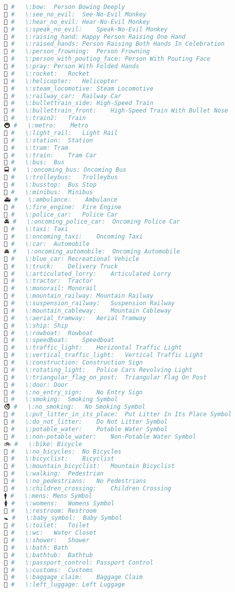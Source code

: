 \begin{lstlisting}[language=Julia, style=julia]
🙇 #   \:bow:  Person Bowing Deeply
🙈 #   \:see_no_evil:  See-No-Evil Monkey
🙉 #   \:hear_no_evil: Hear-No-Evil Monkey
🙊 #   \:speak_no_evil:    Speak-No-Evil Monkey
🙋 #   \:raising_hand: Happy Person Raising One Hand
🙌 #   \:raised_hands: Person Raising Both Hands In Celebration
🙍 #   \:person_frowning:  Person Frowning
🙎 #   \:person_with_pouting_face: Person With Pouting Face
🙏 #   \:pray: Person With Folded Hands
🚀 #   \:rocket:   Rocket
🚁 #   \:helicopter:   Helicopter
🚂 #   \:steam_locomotive: Steam Locomotive
🚃 #   \:railway_car:  Railway Car
🚄 #   \:bullettrain_side: High-Speed Train
🚅 #   \:bullettrain_front:    High-Speed Train With Bullet Nose
🚆 #   \:train2:   Train
🚇 #   \:metro:    Metro
🚈 #   \:light_rail:   Light Rail
🚉 #   \:station:  Station
🚊 #   \:tram: Tram
🚋 #   \:train:    Tram Car
🚌 #   \:bus:  Bus
🚍 #   \:oncoming_bus: Oncoming Bus
🚎 #   \:trolleybus:   Trolleybus
🚏 #   \:busstop:  Bus Stop
🚐 #   \:minibus:  Minibus
🚑 #   \:ambulance:    Ambulance
🚒 #   \:fire_engine:  Fire Engine
🚓 #   \:police_car:   Police Car
🚔 #   \:oncoming_police_car:  Oncoming Police Car
🚕 #   \:taxi: Taxi
🚖 #   \:oncoming_taxi:    Oncoming Taxi
🚗 #   \:car:  Automobile
🚘 #   \:oncoming_automobile:  Oncoming Automobile
🚙 #   \:blue_car: Recreational Vehicle
🚚 #   \:truck:    Delivery Truck
🚛 #   \:articulated_lorry:    Articulated Lorry
🚜 #   \:tractor:  Tractor
🚝 #   \:monorail: Monorail
🚞 #   \:mountain_railway: Mountain Railway
🚟 #   \:suspension_railway:   Suspension Railway
🚠 #   \:mountain_cableway:    Mountain Cableway
🚡 #   \:aerial_tramway:   Aerial Tramway
🚢 #   \:ship: Ship
🚣 #   \:rowboat:  Rowboat
🚤 #   \:speedboat:    Speedboat
🚥 #   \:traffic_light:    Horizontal Traffic Light
🚦 #   \:vertical_traffic_light:   Vertical Traffic Light
🚧 #   \:construction: Construction Sign
🚨 #   \:rotating_light:   Police Cars Revolving Light
🚩 #   \:triangular_flag_on_post:  Triangular Flag On Post
🚪 #   \:door: Door
🚫 #   \:no_entry_sign:    No Entry Sign
🚬 #   \:smoking:  Smoking Symbol
🚭 #   \:no_smoking:   No Smoking Symbol
🚮 #   \:put_litter_in_its_place:  Put Litter In Its Place Symbol
🚯 #   \:do_not_litter:    Do Not Litter Symbol
🚰 #   \:potable_water:    Potable Water Symbol
🚱 #   \:non-potable_water:    Non-Potable Water Symbol
🚲 #   \:bike: Bicycle
🚳 #   \:no_bicycles:  No Bicycles
🚴 #   \:bicyclist:    Bicyclist
🚵 #   \:mountain_bicyclist:   Mountain Bicyclist
🚶 #   \:walking:  Pedestrian
🚷 #   \:no_pedestrians:   No Pedestrians
🚸 #   \:children_crossing:    Children Crossing
🚹 #   \:mens: Mens Symbol
🚺 #   \:womens:   Womens Symbol
🚻 #   \:restroom: Restroom
🚼 #   \:baby_symbol:  Baby Symbol
🚽 #   \:toilet:   Toilet
🚾 #   \:wc:   Water Closet
🚿 #   \:shower:   Shower
🛀 #   \:bath: Bath
🛁 #   \:bathtub:  Bathtub
🛂 #   \:passport_control: Passport Control
🛃 #   \:customs:  Customs
🛄 #   \:baggage_claim:    Baggage Claim
🛅 #   \:left_luggage: Left Luggage  
\end{lstlisting}